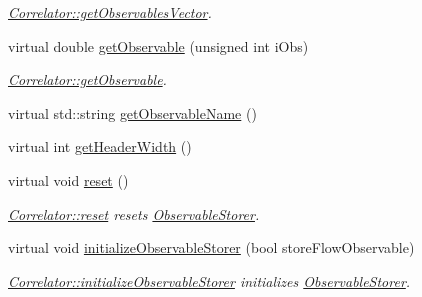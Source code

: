 \begin{DoxyCompactItemize}
\begin{DoxyCompactList}\small\item\em \mbox{\hyperlink{class_correlator_a7fb062b098beb078f3e546f4717b4941}{Correlator\+::get\+Observables\+Vector}}. \end{DoxyCompactList}\item 
virtual double \mbox{\hyperlink{class_correlator_aada8184c033e0465f540a368465c9ba5}{get\+Observable}} (unsigned int i\+Obs)
\begin{DoxyCompactList}\small\item\em \mbox{\hyperlink{class_correlator_aada8184c033e0465f540a368465c9ba5}{Correlator\+::get\+Observable}}. \end{DoxyCompactList}\item 
virtual std\+::string \mbox{\hyperlink{class_correlator_ad1fa59e864917c3e48da037f90c3488f}{get\+Observable\+Name}} ()
\item 
virtual int \mbox{\hyperlink{class_correlator_a76375274cb578f48b9d51489ca8cd503}{get\+Header\+Width}} ()
\item 
virtual void \mbox{\hyperlink{class_correlator_aacca40262d2cd62f0a3964e832f948c1}{reset}} ()
\begin{DoxyCompactList}\small\item\em \mbox{\hyperlink{class_correlator_aacca40262d2cd62f0a3964e832f948c1}{Correlator\+::reset}} resets \mbox{\hyperlink{class_observable_storer}{Observable\+Storer}}. \end{DoxyCompactList}\item 
virtual void \mbox{\hyperlink{class_correlator_ab99886c09dd27dfc8676d0032cecf9bc}{initialize\+Observable\+Storer}} (bool store\+Flow\+Observable)
\begin{DoxyCompactList}\small\item\em \mbox{\hyperlink{class_correlator_ab99886c09dd27dfc8676d0032cecf9bc}{Correlator\+::initialize\+Observable\+Storer}} initializes \mbox{\hyperlink{class_observable_storer}{Observable\+Storer}}. \end{DoxyCompactList}\end{DoxyCompactItemize}

